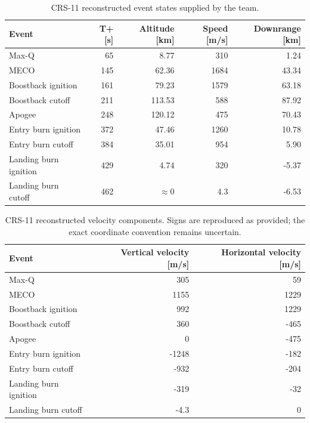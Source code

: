 \documentclass[11pt,letterpaper]{article}
\begin{document}
\begin{table}[H]
\centering
\small
\begin{tabularx}{\textwidth}{Yrrrr}
\toprule
{}\color{white}\textbf{Event} & \color{white}\textbf{T+ [s]} & \color{white}\textbf{Altitude [km]} & \color{white}\textbf{Speed [m/s]} & \color{white}\textbf{Downrange [km]}\\
\midrule
Max-Q & 65 & 8.77 & 310 & 1.24\\
MECO & 145 & 62.36 & 1684 & 43.34\\
Boostback ignition & 161 & 79.23 & 1579 & 63.18\\
Boostback cutoff & 211 & 113.53 & 588 & 87.92\\
Apogee & 248 & 120.12 & 475 & 70.43\\
Entry burn ignition & 372 & 47.46 & 1260 & 10.78\\
Entry burn cutoff & 384 & 35.01 & 954 & 5.90\\
Landing burn ignition & 429 & 4.74 & 320 & -5.37\\
Landing burn cutoff & 462 & $\approx 0$ & 4.3 & -6.53\\
\bottomrule
\end{tabularx}
\caption{CRS-11 reconstructed event states supplied by the team.}\label{tab:crs-events}
\end{table}

\begin{table}[H]
\centering
\small
\begin{tabularx}{\textwidth}{Yrr}
\toprule
{}\color{white}\textbf{Event} & \color{white}\textbf{Vertical velocity [m/s]} & \color{white}\textbf{Horizontal velocity [m/s]}\\
\midrule
Max-Q & 305 & 59\\
MECO & 1155 & 1229\\
Boostback ignition & 992 & 1229\\
Boostback cutoff & 360 & -465\\
Apogee & 0 & -475\\
Entry burn ignition & -1248 & -182\\
Entry burn cutoff & -932 & -204\\
Landing burn ignition & -319 & -32\\
Landing burn cutoff & -4.3 & 0\\
\bottomrule
\end{tabularx}
\caption{CRS-11 reconstructed velocity components. Signs are reproduced as provided; the exact coordinate convention remains uncertain.}\label{tab:crs-components}
\end{table}
\end{document}
